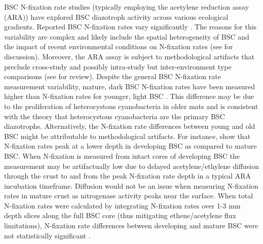 BSC N-fixation rate studies (typically employing the acetylene reduction assay
(ARA)) have explored BSC diazotroph activity across various ecological
gradients. Reported BSC N-fixation rates vary significantly \citep{Evans_2001}.
The reasons for this variability are complex and likely include the spatial
heterogeneity of BSC \citep{Evans_2001} and the impact of recent environmental
conditions on N-fixation rates (see \citet{Belnap_2001} for discussion).
Moreover, the ARA assay is subject to methodological artifacts that preclude
cross-study and possibly intra-study but inter-environment type comparisons
(see \citet{Belnap_2001} for review). Despite the general BSC N-fixation rate
measurement variability, mature, dark BSC N-fixation rates have been measured
higher than N-fixation rates for younger, light BSC \citep{Belnap_2002,
14766579}. This difference may be due to the proliferation of heterocystous
cyanobacteria in older mats and is consistent with the theory that
heterocystous cyanobacteria are the primary BSC diazotrophs. Alternatively, the
N-fixation rate differences between young and old BSC might be attributable to
methodological artifacts. For instance, \citet{15643930} show that N-fixation
rates peak at a lower depth in developing BSC as compared to mature BSC. When 
N-fixation is measured from intact cores of developing BSC the measurement
may be artifactually low due to delayed acetylene/ethylene diffusion through
the crust to and from the peak N-fixation rate depth in a typical ARA
incubation timeframe. Diffusion would not be an issue when measuring N-fixation
rates in mature crust as nitrogenase activity peaks near the surface. When
total N-fixation rates were calculated by integrating N-fixation rates over 1-3
mm depth slices along the full BSC core (thus mitigating ethene/acetylene flux
limitations), N-fixation rate differences between developing and mature BSC
were not statistically significant \citep{15643930}.

